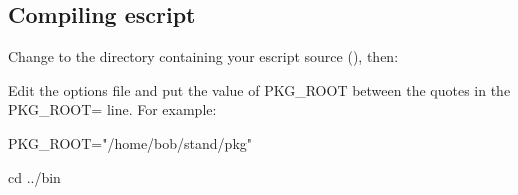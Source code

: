 % 
% 
% 
% 
% 
% 
% 

\subsection{Compiling escript}\label{sec:compileescriptlinux}

Change to the directory containing your escript source (), then:


Edit the options file and put the value of PKG_ROOT between the quotes in the PKG_ROOT= line.
For example:
\begin{shellCode}
PKG_ROOT="/home/bob/stand/pkg"
\end{shellCode}

\begin{shellCode}
cd ../bin
\end{shellCode}

